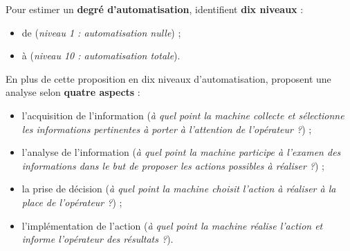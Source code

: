 		\begin{leftBarAuthorOpinion}
			Pour estimer un \textbf{degré d'automatisation}, \cite{sheridan-verplank:1978:human-computer-control} identifient \textbf{dix niveaux} :
			\begin{itemize}
				\item de  (\textit{niveau 1 : automatisation nulle}) ;
				\item à  (\textit{niveau 10 : automatisation totale}).
			\end{itemize}
			
			En plus de cette proposition en dix niveaux d'automatisation, \cite{parasuraman-etal:2000:model-types-levels} proposent une analyse selon \textbf{quatre aspects} :
			\begin{itemize}
				\item l'acquisition de l'information (\textit{à quel point la machine collecte et sélectionne les informations pertinentes à porter à l'attention de l'opérateur ?}) ;
				\item l'analyse de l'information (\textit{à quel point la machine participe à l'examen des informations dans le but de proposer les actions possibles à réaliser ?}) ;
				\item la prise de décision (\textit{à quel point la machine choisit l'action à réaliser à la place de l'opérateur ?}) ;
				\item l'implémentation de l'action (\textit{à quel point la machine réalise l'action et informe l'opérateur des résultats ?}).
			\end{itemize}
			

\end{leftBarAuthorOpinion}
